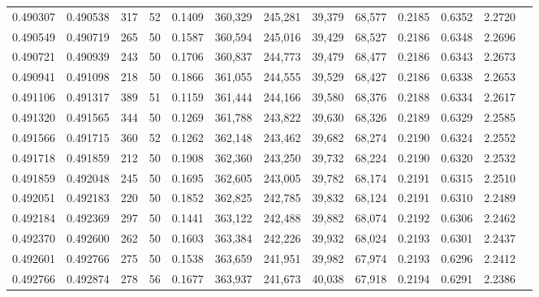 \begin{tabular}{rrrrrrrrrrrrr}
0.490307 & 0.490538 &   317 &  52 &                                     0.1409 & 360,329 & 245,281 &  39,379 &  68,577 & 0.2185 & 0.6352 & 2.2720 \\
0.490549 & 0.490719 &   265 &  50 &                                     0.1587 & 360,594 & 245,016 &  39,429 &  68,527 & 0.2186 & 0.6348 & 2.2696 \\
0.490721 & 0.490939 &   243 &  50 &                                     0.1706 & 360,837 & 244,773 &  39,479 &  68,477 & 0.2186 & 0.6343 & 2.2673 \\
0.490941 & 0.491098 &   218 &  50 &                                     0.1866 & 361,055 & 244,555 &  39,529 &  68,427 & 0.2186 & 0.6338 & 2.2653 \\
0.491106 & 0.491317 &   389 &  51 &                                     0.1159 & 361,444 & 244,166 &  39,580 &  68,376 & 0.2188 & 0.6334 & 2.2617 \\
0.491320 & 0.491565 &   344 &  50 &                                     0.1269 & 361,788 & 243,822 &  39,630 &  68,326 & 0.2189 & 0.6329 & 2.2585 \\
0.491566 & 0.491715 &   360 &  52 &                                     0.1262 & 362,148 & 243,462 &  39,682 &  68,274 & 0.2190 & 0.6324 & 2.2552 \\
0.491718 & 0.491859 &   212 &  50 &                                     0.1908 & 362,360 & 243,250 &  39,732 &  68,224 & 0.2190 & 0.6320 & 2.2532 \\
0.491859 & 0.492048 &   245 &  50 &                                     0.1695 & 362,605 & 243,005 &  39,782 &  68,174 & 0.2191 & 0.6315 & 2.2510 \\
0.492051 & 0.492183 &   220 &  50 &                                     0.1852 & 362,825 & 242,785 &  39,832 &  68,124 & 0.2191 & 0.6310 & 2.2489 \\
0.492184 & 0.492369 &   297 &  50 &                                     0.1441 & 363,122 & 242,488 &  39,882 &  68,074 & 0.2192 & 0.6306 & 2.2462 \\
0.492370 & 0.492600 &   262 &  50 &                                     0.1603 & 363,384 & 242,226 &  39,932 &  68,024 & 0.2193 & 0.6301 & 2.2437 \\
0.492601 & 0.492766 &   275 &  50 &                                     0.1538 & 363,659 & 241,951 &  39,982 &  67,974 & 0.2193 & 0.6296 & 2.2412 \\
0.492766 & 0.492874 &   278 &  56 &                                     0.1677 & 363,937 & 241,673 &  40,038 &  67,918 & 0.2194 & 0.6291 & 2.2386 \\

\end{tabular}
